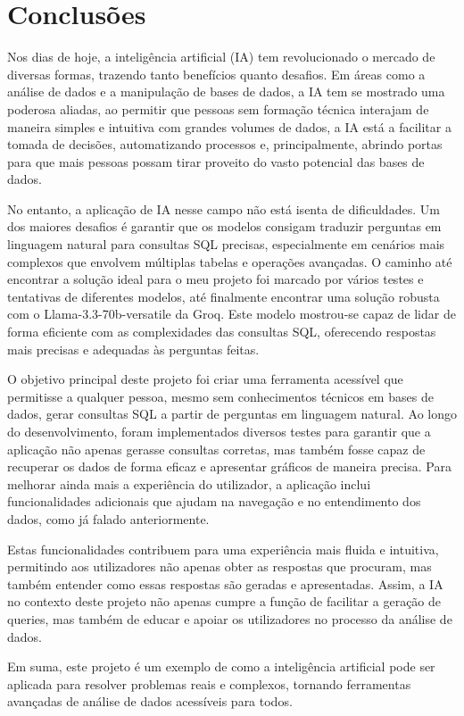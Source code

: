 \documentclass{article}
\begin{document}
\section{Conclusões}

Nos dias de hoje, a inteligência artificial (IA) tem revolucionado o mercado de diversas formas, trazendo tanto benefícios quanto desafios. Em áreas como a análise de dados e a manipulação de bases de dados, a IA tem se mostrado uma poderosa aliadas, ao permitir que pessoas sem formação técnica interajam de maneira simples e intuitiva com grandes volumes de dados, a IA está a facilitar a tomada de decisões, automatizando processos e, principalmente, abrindo portas para que mais pessoas possam tirar proveito do vasto potencial das bases de dados.

No entanto, a aplicação de IA nesse campo não está isenta de dificuldades. Um dos maiores desafios é garantir que os modelos consigam traduzir perguntas em linguagem natural para consultas SQL precisas, especialmente em cenários mais complexos que envolvem múltiplas tabelas e operações avançadas. O caminho até encontrar a solução ideal para o meu projeto foi marcado por vários testes e tentativas de diferentes modelos, até finalmente encontrar uma solução robusta com o Llama-3.3-70b-versatile da Groq. Este modelo mostrou-se capaz de lidar de forma eficiente com as complexidades das consultas SQL, oferecendo respostas mais precisas e adequadas às perguntas feitas.

O objetivo principal deste projeto foi criar uma ferramenta acessível que permitisse a qualquer pessoa, mesmo sem conhecimentos técnicos em bases de dados, gerar consultas SQL a partir de perguntas em linguagem natural. Ao longo do desenvolvimento, foram implementados diversos testes para garantir que a aplicação não apenas gerasse consultas corretas, mas também fosse capaz de recuperar os dados de forma eficaz e apresentar gráficos de maneira precisa. Para melhorar ainda mais a experiência do utilizador, a aplicação inclui funcionalidades adicionais que ajudam na navegação e no entendimento dos dados, como já falado anteriormente.

Estas funcionalidades contribuem para uma experiência mais fluida e intuitiva, permitindo aos utilizadores não apenas obter as respostas que procuram, mas também entender como essas respostas são geradas e apresentadas. Assim, a IA no contexto deste projeto não apenas cumpre a função de facilitar a geração de queries, mas também de educar e apoiar os utilizadores no processo da análise de dados.

Em suma, este projeto é um exemplo de como a inteligência artificial pode ser aplicada para resolver problemas reais e complexos, tornando ferramentas avançadas de análise de dados acessíveis para todos.



\end{document}
